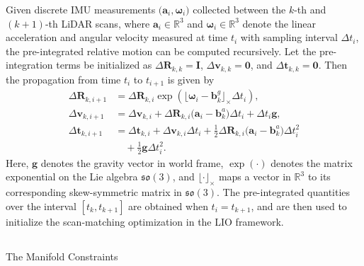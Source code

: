\documentclass[journal,twoside,web]{ieeecolor}
\makeatletter
\let\origsubsection\subsection
\def\subsection{\@ifstar\subsectionstarcolor\subsectioncolorcmd}
\def\subsectioncolorcmd#1{\origsubsection{\textcolor{subsectioncolor}{#1}}}
\def\subsectionstarcolor#1{\origsubsection*{#1}}
\makeatother
\begin{document}
Given discrete IMU measurements \(\bigl(\mathbf{a}_i,\boldsymbol{\omega}_i\bigr)\) collected between the \(k\)-th and \((k+1)\)-th LiDAR scans, where \(\mathbf{a}_i\in\mathbb{R}^3\) and \(\boldsymbol{\omega}_i\in\mathbb{R}^3\) denote the linear acceleration and angular velocity measured at time \(t_i\) with sampling interval \(\Delta t_i\), the pre-integrated relative motion can be computed recursively. Let the pre-integration terms be initialized as \(\Delta \mathbf{R}_{k,k}=\mathbf{I}\), \(\Delta \mathbf{v}_{k,k}=\mathbf{0}\), and \(\Delta \mathbf{t}_{k,k}=\mathbf{0}\). Then the propagation from time \(t_i\) to \(t_{i+1}\) is given by
\begin{subequations}
\begin{align}
    \Delta \mathbf{R}_{k,i+1}
    &= \Delta \mathbf{R}_{k,i}\exp\!\left(\lfloor \boldsymbol{\omega}_i-\mathbf{b}^g_k \rfloor_\times \Delta t_i\right),\\
    \Delta \mathbf{v}_{k,i+1}
    &= \Delta \mathbf{v}_{k,i}
    + \Delta \mathbf{R}_{k,i}\bigl(\mathbf{a}_i-\mathbf{b}^a_k\bigr)\Delta t_i+\Delta t_i \mathbf{g},\\
    \Delta \mathbf{t}_{k,i+1}
    &= \Delta \mathbf{t}_{k,i}
    + \Delta \mathbf{v}_{k,i}\Delta t_i
    + \tfrac{1}{2}\Delta \mathbf{R}_{k,i}\bigl(\mathbf{a}_i-\mathbf{b}^a_k\bigr)\Delta t_i^2\nonumber\\
    &\quad +\frac{1}{2}\mathbf{g}\Delta t_i^2.
\end{align}
\end{subequations}
Here, $\mathbf{g}$ denotes the gravity vector in world frame, \(\exp(\cdot)\) denotes the matrix exponential on the Lie algebra \(\mathfrak{so}(3)\), and \(\lfloor\cdot\rfloor_\times\) maps a vector in \(\mathbb{R}^3\) to its corresponding skew-symmetric matrix in \(\mathfrak{so}(3)\). The pre-integrated quantities over the interval \([t_k,t_{k+1}]\) are obtained when \(t_i=t_{k+1}\), and are then used to initialize the scan-matching optimization in the LIO framework.

\subsection{The Manifold Constraints}
\end{document}

